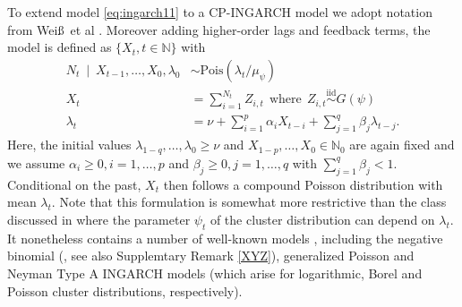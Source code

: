 \documentclass{article}
\begin{document}
To extend model \eqref{eq:ingarch11} to a CP-INGARCH model we adopt notation from Wei\ss\ et al \cite[Sec. 2]{Weiss2017}. Moreover adding higher-order lags and feedback terms, the model is defined as $\{X_t, t \in \mathbb{N}\}$ with %
\begin{align}
N_t \ \mid \ X_{t - 1}, \dots, X_0, \lambda_0 & \sim \text{Pois}(\lambda_t/\mu_\psi) \label{eq:N_CP_original}\\
X_t & = \sum_{i = 1}^{N_t} Z_{i, t} \ \ \text{where} \ \  Z_{i, t} \stackrel{\text{iid}}{\sim} G(\psi)\label{eq:X_CP_original}\\
\lambda_t & = \nu + \sum_{i = 1}^p \alpha_i X_{t - i} + \sum_{j = 1}^q \beta_j \lambda_{t - j}.\label{eq:lambda_CP_original}
\end{align}
Here, the initial values $\lambda_{1 - q}, \dots, \lambda_0 \geq \nu$ and $X_{1 - p}, \dots, X_0 \in \mathbb{N}_0$ are again fixed and we assume $\alpha_i \geq 0, i = 1, \dots, p$ and $\beta_j \geq 0, j = 1, \dots, q$  with $\sum_{j = 1}^q \beta_j < 1$. Conditional on the past, $X_t$ then follows a compound Poisson distribution with mean $\lambda_t$. Note that this formulation is somewhat more restrictive than the class discussed in \citep{Goncalves2015} where the parameter $\psi_t$ of the cluster distribution can depend on $\lambda_t$. It nonetheless contains a number of well-known models \cite[Observation 2]{Goncalves2015}, including the negative binomial (\cite{Xu2012, Weiss2018}, see also Supplemtary Remark \ref{XYZ}), generalized Poisson \cite{Zhu2012} and Neyman Type A \cite{Goncalves2015a} INGARCH models (which arise for logarithmic, Borel and Poisson cluster distributions, respectively).
\end{document}

